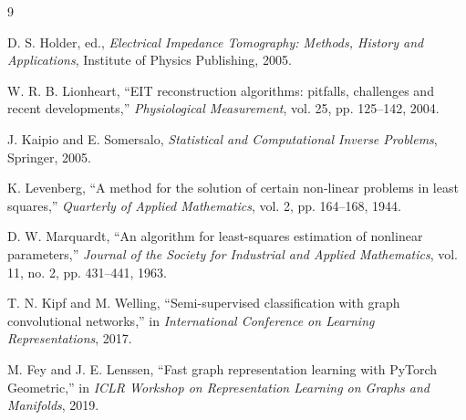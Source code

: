 \documentclass[11pt]{article}
\begin{document}
\begin{thebibliography}{9}

D. S. Holder, ed.,
\emph{Electrical Impedance Tomography: Methods, History and Applications},
Institute of Physics Publishing, 2005.

W. R. B. Lionheart,
``EIT reconstruction algorithms: pitfalls, challenges and recent developments,''
\emph{Physiological Measurement}, vol. 25, pp. 125--142, 2004.

J. Kaipio and E. Somersalo,
\emph{Statistical and Computational Inverse Problems},
Springer, 2005.

K. Levenberg,
``A method for the solution of certain non-linear problems in least squares,''
\emph{Quarterly of Applied Mathematics}, vol. 2, pp. 164--168, 1944.

D. W. Marquardt,
``An algorithm for least-squares estimation of nonlinear parameters,''
\emph{Journal of the Society for Industrial and Applied Mathematics},
vol. 11, no. 2, pp. 431--441, 1963.

T. N. Kipf and M. Welling,
``Semi-supervised classification with graph convolutional networks,''
in \emph{International Conference on Learning Representations}, 2017.

M. Fey and J. E. Lenssen,
``Fast graph representation learning with PyTorch Geometric,''
in \emph{ICLR Workshop on Representation Learning on Graphs and Manifolds}, 2019.

\end{thebibliography}
\end{document}
